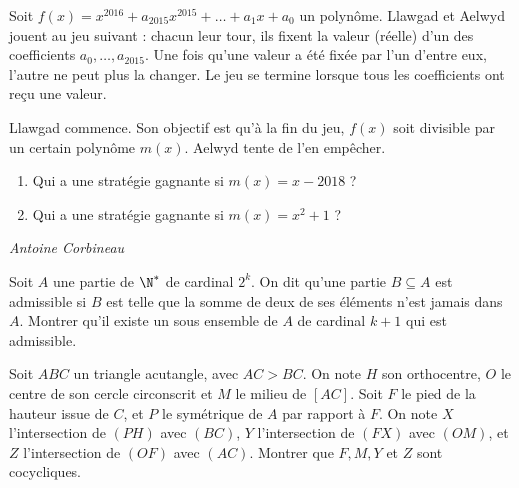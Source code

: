 \begin{exo}{}
Soit $f(x)=x^{2016}+a_{2015}x^{2015}+\dots+a_1x+a_0$ un polynôme. Llawgad et Aelwyd jouent au jeu suivant : chacun leur tour, ils fixent la valeur (réelle) d'un des coefficients $a_0,\dots,a_{2015}$. Une fois qu'une valeur a été fixée par l'un d'entre eux, l'autre ne peut plus la changer. Le jeu se termine lorsque tous les coefficients ont reçu une valeur.

Llawgad commence. Son objectif est qu'à la fin du jeu, $f(x)$ soit divisible par un certain polynôme $m(x)$. Aelwyd tente de l'en empêcher.

\begin{enumerate}
    \item Qui a une stratégie gagnante si $m(x) = x-2018$ ?
    \item Qui a une stratégie gagnante si $m(x) = x^2+1$ ?
\end{enumerate}

\medskip
\textit{Antoine Corbineau}
\end{exo}


\begin{exo}{}
Soit $A$ une partie de $\N^*$ de cardinal $2^k$. On dit qu'une partie $B\subseteq A$ est admissible si $B$ est telle que la somme de deux de ses éléments n'est jamais dans $A$. Montrer qu'il existe un sous ensemble de $A$ de cardinal $k+1$ qui est admissible.
\end{exo}

\begin{exo}{}
Soit $ABC$ un triangle acutangle, avec $AC > BC$. On note $H$ son orthocentre, $O$ le centre de son cercle circonscrit et $M$ le milieu de $[AC]$. Soit $F$ le pied de la hauteur issue de $C$, et $P$ le symétrique de $A$ par rapport à $F$. On note $X$ l'intersection de $(PH)$ avec $(BC)$, $Y$ l'intersection de $(FX)$ avec $(OM)$, et $Z$ l'intersection de $(OF)$ avec $(AC)$. Montrer que $F, M, Y$ et $Z$ sont cocycliques.

\end{exo}

